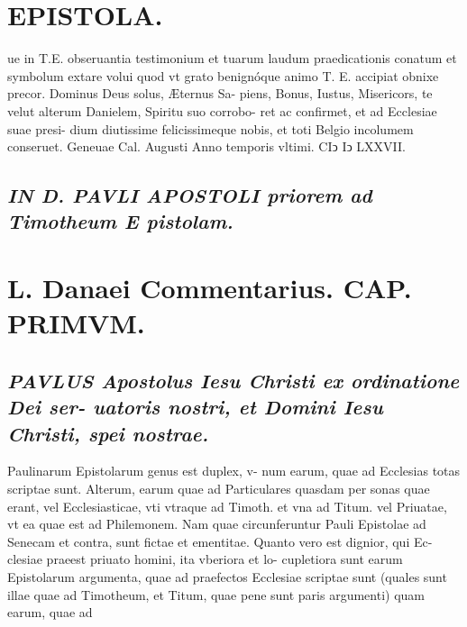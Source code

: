 \documentclass{article}
\begin{document}
\begin{pages}
\section*{EPISTOLA. }\pstart ue in T.E. obseruantia testimonium et tuarum laudum praedicationis conatum et symbolum extare volui quod vt grato benignóque animo T. E. accipiat obnixe precor. Dominus Deus solus, Æternus Sa- piens, Bonus, Iustus, Misericors, te velut alterum Danielem, Spiritu suo corrobo- ret ac confirmet, et ad Ecclesiae suae presi- dium diutissime felicissimeque nobis, et toti Belgio incolumem conseruet. Geneuae Cal. Augusti Anno temporis vltimi. CIↄ Iↄ LXXVII.  \pend
{}
{}
\subsection*{\textit{IN D. PAVLI APOSTOLI priorem ad Timotheum E pistolam. }}
\endnumbering\beginnumbering\section{L. Danaei Commentarius. CAP. PRIMVM.}
{}
\subsection*{\textit{\huge\textbf{P}\normalsize AVLUS Apostolus Iesu  Christi ex ordinatione Dei ser- uatoris nostri, et Domini Iesu Christi, spei nostrae. }}\pstart Paulinarum Epistolarum genus est duplex, v- num earum, quae ad Ecclesias totas scriptae sunt. Alterum, earum quae ad Particulares quasdam per sonas quae erant, vel Ecclesiasticae, vti vtraque ad Timoth. et vna ad Titum. vel Priuatae, vt ea quae est ad Philemonem. Nam quae circunferuntur Pauli Epistolae ad Senecam et contra, sunt fictae et ementitae. Quanto vero est dignior, qui Ec- clesiae praeest priuato homini, ita vberiora et lo- cupletiora sunt earum Epistolarum argumenta, quae ad praefectos Ecclesiae scriptae sunt (quales sunt illae quae ad Timotheum, et Titum, quae pene sunt paris argumenti) quam earum, quae ad  \pend

\end{pages}
\end{document}
